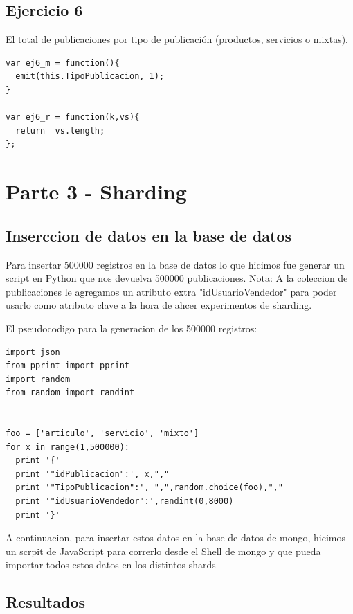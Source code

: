 \documentclass[a4paper, 10pt, twoside]{article}
\begin{document}
\subsection{Ejercicio 6}
El total de publicaciones por tipo de publicaci\'on (productos, servicios o mixtas).

\begin{lstlisting}[caption=Ejercicio 6]
var ej6_m = function(){
  emit(this.TipoPublicacion, 1);
}

var ej6_r = function(k,vs){
  return  vs.length;
};
\end{lstlisting}
\section{Parte 3 - Sharding}

\subsection{Inserccion de datos en la base de datos}
Para insertar 500000 registros en la base de datos lo que hicimos fue generar un script en Python que nos devuelva 500000 publicaciones. 
Nota: A la coleccion de publicaciones le agregamos un atributo extra "idUsuarioVendedor" para poder usarlo como atributo clave a la hora de ahcer experimentos de sharding.

El pseudocodigo para la generacion de los 500000 registros:
\begin{verbatim}
import json
from pprint import pprint
import random
from random import randint


foo = ['articulo', 'servicio', 'mixto']
for x in range(1,500000):
  print '{'
  print '"idPublicacion":', x,","
  print '"TipoPublicacion":', ",",random.choice(foo),","
  print '"idUsuarioVendedor":',randint(0,8000)
  print '}'

\end{verbatim}


A continuacion, para insertar estos datos en la base de datos de mongo, hicimos un scrpit de JavaScript para correrlo desde el Shell de mongo y que pueda importar todos estos datos en los distintos shards

\subsection{Resultados}
\end{document}
